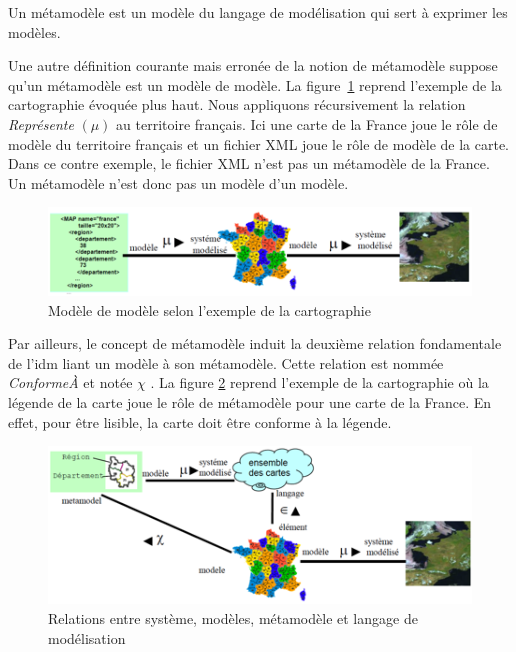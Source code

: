 \begin{definition}
Un métamodèle est un modèle du langage de modélisation qui sert à exprimer les 
modèles.
\end{definition}

Une autre définition courante mais erronée de la notion de métamodèle suppose 
qu'un métamodèle est un modèle de modèle. La figure~\ref{fig:modelofmodel} 
reprend l'exemple de la cartographie évoquée plus haut. Nous appliquons 
récursivement la relation \textit{Représente} $(\mu)$ au territoire 
français. Ici une carte de la France joue le rôle de modèle du territoire 
français et un fichier XML joue le rôle de modèle de la carte. Dans ce contre 
exemple, le fichier XML n'est pas un métamodèle de la France. Un métamodèle 
n'est donc pas un modèle d'un modèle.

\begin{figure}[!htbp]
 \begin{center}
  \includegraphics[width=1\textwidth]{figures/images/Chapitre1/modelofmodel.png}
 \end{center}
 \caption{Modèle de modèle selon l'exemple de la cartographie 
\protect\cite{favre2006ingenierie}}
 \label{fig:modelofmodel}
\end{figure}

Par ailleurs, le concept de métamodèle induit la deuxième relation fondamentale 
de l'\gls{idm} liant un modèle à son métamodèle. Cette relation est nommée 
\textit{ConformeÀ} et notée $\chi$ \cite{bezivin2004search} 
\cite{favre2004towards}. La figure \ref{fig:carteFavre} reprend l'exemple de la 
cartographie où la légende de la carte joue le rôle de métamodèle pour 
une carte de la France. En effet, pour être lisible, la carte doit être conforme 
à la légende.

\begin{figure}[!htbp]
 \begin{center}
  \includegraphics[width=1\textwidth]{figures/images/Chapitre1/cartecompleteIDM.png}
 \end{center}
 \caption{Relations entre système, modèles, métamodèle et langage de 
modélisation \protect\cite{favre2006ingenierie}}
 \label{fig:carteFavre}
\end{figure}

